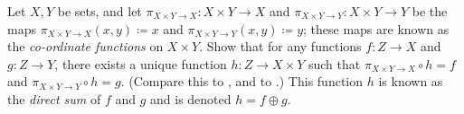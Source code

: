 \begin{ex}\label{i:ex:3.5.7}
  Let \(X, Y\) be sets, and let \(\pi_{X \times Y \to X} : X \times Y \to X\) and \(\pi_{X \times Y \to Y} : X \times Y \to Y\) be the maps \(\pi_{X \times Y \to X}(x, y) \coloneqq x\) and \(\pi_{X \times Y \to Y}(x, y) \coloneqq y\);
  these maps are known as the \emph{co-ordinate functions} on \(X \times Y\).
  Show that for any functions \(f : Z \to X\) and \(g : Z \to Y\), there exists a unique function \(h : Z \to X \times Y\) such that \(\pi_{X \times Y \to X} \circ h = f\) and \(\pi_{X \times Y \to Y} \circ h = g\).
  (Compare this to , and to .)
  This function \(h\) is known as the \emph{direct sum} of \(f\) and \(g\) and is denoted \(h = f \oplus g\).
\end{ex}

